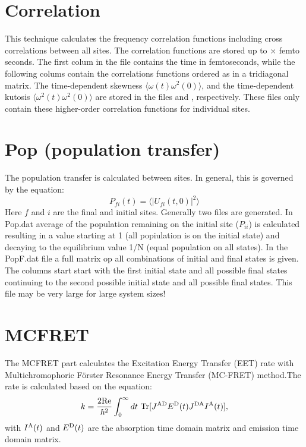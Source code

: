 \section{Correlation}
This technique calculates the frequency correlation functions including cross correlations between all sites. The correlation functions are stored up to $\times$ femto seconds. The first colum in the file  contains the time in femtoseconds, while the following colums contain the correlations functions ordered as in a tridiagonal matrix. The time-dependent skewness $\langle \omega(t)\omega^2(0) \rangle$, and the time-dependent kutosis $\langle \omega^2(t)\omega^2(0) \rangle$ are stored in the files  and , respectively. These files only contain these higher-order correlation functions for individual sites.
\section{Pop (population transfer)}
The population transfer is calculated between sites. In general, this is governed by the equation:
\begin{equation}
P_{fi}(t)=\langle |U_{fi}(t,0)|^2 \rangle
\end{equation}
Here $f$ and $i$ are the final and initial sites. Generally two files are generated. In Pop.dat average of the population remaining on the initial site ($P_{ii}$) is calculated resulting in a value starting at 1 (all popiulation is on the initial state) and decaying to the equilibrium value 1/N (equal population on all states). In the PopF.dat file a full matrix op all combinations of initial and final states is given. The columns start start with the first initial state and all possible final states continuing to the second possible initial state and all possible final states. This file may be very large for large system sizes!

\section{MCFRET}
The MCFRET part calculates the Excitation Energy Transfer (EET) rate with Multichromophoric Förster Resonance Energy Transfer (MC-FRET) method.\cite{Jang.2004.Phys.Rev.Lett..92.218301,Jang.2007.J.Phys.Chem.B..111.6807,Zhong.2023.J.Chem.Phys..158.064103}The rate is calculated based on the equation:
\begin{equation}\label{eq:17} 
    k=\frac{\rm 2Re}{\hbar^2}\int_{0}^{\infty}dt\ \textrm{Tr}[J^{\textrm {AD}}E^{\textrm D}(t)J^{\textrm {DA}}I^{\textrm A}(t)],
\end{equation}
with $I^{\textrm A}(t)$ and $E^{\textrm D}(t)$ are the absorption time domain matrix and emission time domain matrix. 

